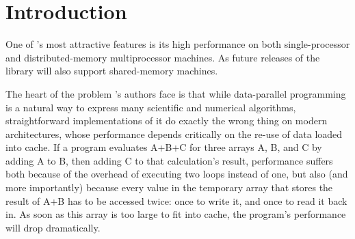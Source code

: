\chapter{Introduction}
\label{sec:Introduction}
One of \ippl 's most attractive features is its high performance on both single-processor and distributed-memory multiprocessor machines. As future releases of the library will also support shared-memory machines. 

The heart of the problem \ippl 's authors face is that while data-parallel programming is a natural way to express many scientific and numerical algorithms, straightforward implementations of it do exactly the wrong thing on modern architectures, whose performance depends critically on the re-use of data loaded into cache. If a program evaluates A+B+C for three arrays A, B, and C by adding A to B, then adding C to that calculation's result, performance suffers both because of the overhead of executing two loops instead of one, but also (and more importantly) because every value in the temporary array that stores the result of A+B has to be accessed twice: once to write it, and once to read it back in. As soon as this array is too large to fit into cache, the program's performance will drop dramatically.




